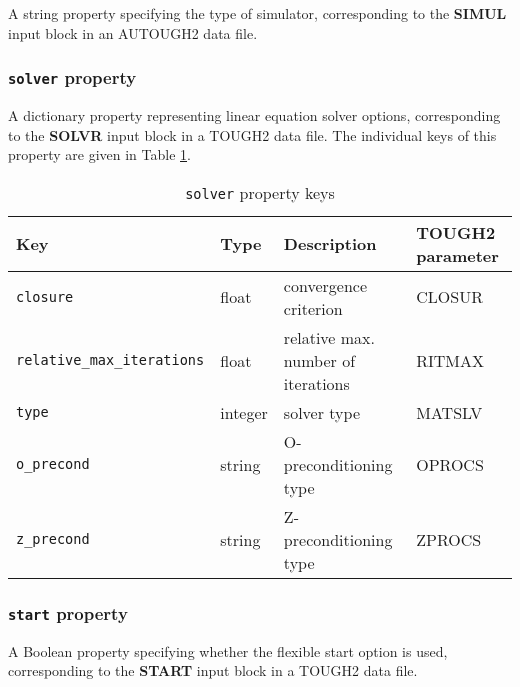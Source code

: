 A string property specifying the type of simulator, corresponding to the \textbf{SIMUL} input block in an AUTOUGH2 data file.

\begin{snugshade}
\subsubsection{\texttt{solver} property}
\end{snugshade}
\label{sec:t2data:solver}

A dictionary property representing linear equation solver options, corresponding to the \textbf{SOLVR} input block in a TOUGH2 data file.  The individual keys of this property are given in Table \ref{tb:solver}.

\begin{table}
  \begin{center}
    \begin{tabular}{|l|l|l|l|}
      \hline
      \textbf{Key} & \textbf{Type} & \textbf{Description} & \textbf{TOUGH2 parameter}\\
      \hline
      \texttt{closure} & float & convergence criterion & CLOSUR\\
      \texttt{relative\_max\_iterations} & float & relative max. number of iterations & RITMAX\\
      \texttt{type} & integer & solver type & MATSLV\\
      \texttt{o\_precond} & string & O-preconditioning type & OPROCS\\
      \texttt{z\_precond} & string & Z-preconditioning type & ZPROCS\\
      \hline
    \end{tabular}
    \caption{\texttt{solver} property keys}
    \label{tb:solver}
  \end{center}
\end{table}

\begin{snugshade}
\subsubsection{\texttt{start} property}
\end{snugshade}
\label{sec:t2data:start}

A Boolean property specifying whether the flexible start option is used, corresponding to the \textbf{START} input block in a TOUGH2 data file.

